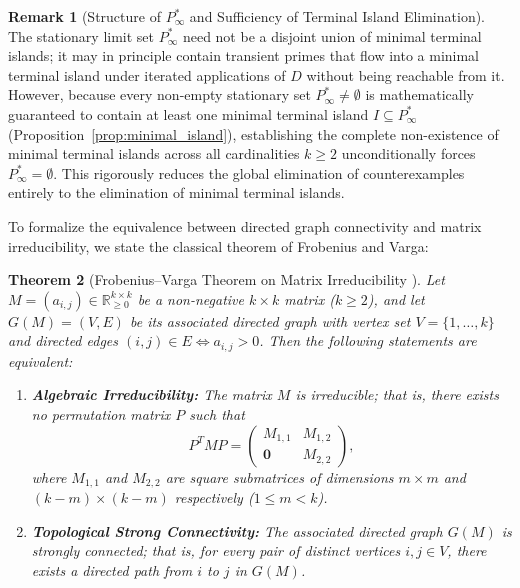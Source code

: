 \documentclass[11pt,a4paper]{article}
\newtheorem{theorem}{Theorem}[section]
\theoremstyle{definition}
\newtheorem{remark}[theorem]{Remark}
\begin{document}
\begin{remark}[Structure of $P^*_\infty$ and Sufficiency of Terminal Island Elimination]
\label{rem:transient_structure}
The stationary limit set $P^*_\infty$ need not be a disjoint union of minimal terminal islands; it may in principle contain transient primes that flow into a minimal terminal island under iterated applications of $D$ without being reachable from it. However, because every non-empty stationary set $P^*_\infty \neq \emptyset$ is mathematically guaranteed to contain at least one minimal terminal island $I \subseteq P^*_\infty$ (Proposition~\ref{prop:minimal_island}), establishing the complete non-existence of minimal terminal islands across all cardinalities $k \ge 2$ unconditionally forces $P^*_\infty = \emptyset$. This rigorously reduces the global elimination of counterexamples entirely to the elimination of minimal terminal islands.
\end{remark}

To formalize the equivalence between directed graph connectivity and matrix irreducibility, we state the classical theorem of Frobenius and Varga:

\begin{theorem}[Frobenius--Varga Theorem on Matrix Irreducibility \cite{frobenius1912, varga2009}]
\label{thm:varga_irreducibility}
Let $M = (a_{i,j}) \in \mathbb{R}_{\ge 0}^{k \times k}$ be a non-negative $k \times k$ matrix ($k \ge 2$), and let $G(M) = (V, E)$ be its associated directed graph with vertex set $V = \{1, \dots, k\}$ and directed edges $(i, j) \in E \iff a_{i,j} > 0$. Then the following statements are equivalent:
\begin{enumerate}
    \item \textbf{Algebraic Irreducibility:} The matrix $M$ is irreducible; that is, there exists no permutation matrix $P$ such that
    \[
    P^T M P = \begin{pmatrix} M_{1,1} & M_{1,2} \\ \mathbf{0} & M_{2,2} \end{pmatrix},
    \]
    where $M_{1,1}$ and $M_{2,2}$ are square submatrices of dimensions $m \times m$ and $(k-m) \times (k-m)$ respectively ($1 \le m < k$).
    \item \textbf{Topological Strong Connectivity:} The associated directed graph $G(M)$ is strongly connected; that is, for every pair of distinct vertices $i, j \in V$, there exists a directed path from $i$ to $j$ in $G(M)$.
\end{enumerate}
\end{theorem}
\end{document}
